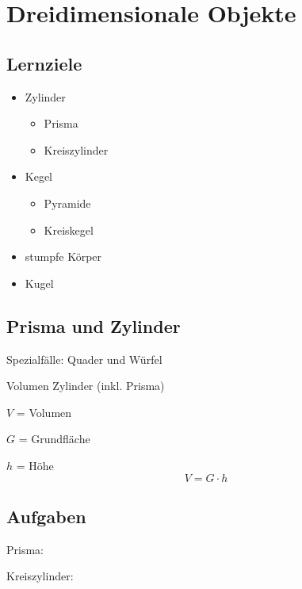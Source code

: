 \section{Dreidimensionale Objekte}


\subsection*{Lernziele}
\begin{itemize}
\item Zylinder
  \begin{itemize}
  \item Prisma
  \item Kreiszylinder
    \end{itemize}
\item Kegel
  \begin{itemize}
  \item Pyramide
  \item Kreiskegel
  \end{itemize}
  \item stumpfe Körper
  \item Kugel
\end{itemize}
\newpage

\subsection{Prisma und Zylinder}
Spezialfälle: Quader und Würfel

\begin{gesetz}{Volumen Zylinder (inkl. Prisma)}{}
  
  $V$ = Volumen
  
  $G$ = Grundfläche

  $h$ = Höhe
  $$V = G\cdot{}h$$
  \end{gesetz}


\subsection*{Aufgaben}
Prisma:


Kreiszylinder:
\newpage

